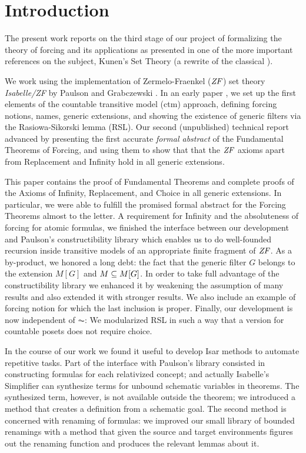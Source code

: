 \section{Introduction}
\label{sec:introduction}

The present work reports on the third stage of our project of
formalizing the theory of forcing and its applications as presented in
one of the more
important references on the subject, Kunen's Set Theory
\cite{kunen2011set} (a rewrite of the classical \cite{kunen1980}). 

We
work using the  implementation of Zermelo-Fraenkel ($\mathit{ZF}$)
set theory \emph{Isabelle/ZF} by Paulson and Grabczewski \cite{DBLP:journals/jar/PaulsonG96}. In
an early paper \cite{2018arXiv180705174G}, we set up the first
elements of the countable transitive model (ctm) approach, defining
forcing notions, names, generic extensions, and
showing the existence of generic filters via the Rasiowa-Sikorski
lemma (RSL). Our second (unpublished) technical report
\cite{2019arXiv190103313G} advanced by presenting the first accurate
\emph{formal abstract} of the Fundamental Theorems of Forcing, and
using them to show that that the $\mathit{ZF}$ axioms apart from Replacement
and Infinity hold in all generic extensions.

This paper contains the proof of Fundamental Theorems and complete
proofs of the Axioms of Infinity, Replacement, and Choice in all
generic extensions. In particular, we were able to fulfill the
promised formal abstract for the Forcing 
Theorems almost to the letter. A requirement for Infinity and the
absoluteness of forcing for atomic formulas, we finished the interface
between our development and
Paulson's constructibility library \cite{paulson_2003} which enables
us to do well-founded
recursion inside transitive models of an appropriate finite fragment
of $\mathit{ZF}$. As a by-product, we honored a long debt: the fact that the
generic filter $G$ belongs to the extension $M[G]$ and 
$M\subseteq M[G]$. In order to take full advantage of the constructibility library
we enhanced it by weakening the assumption of many results and also
extended it with stronger results. %
We also include an example of forcing notion for which
the last inclusion is proper. 
Finally, our development is now independent of $\AC$: We modularized
RSL in such a way that a version for countable 
posets does not require choice.

In the course of our work we found it useful to develop Isar methods to
automate repetitive tasks. Part of the interface with Paulson's
library consisted in constructing formulas for each relativized
concept; and actually Isabelle's Simplifier can
synthesize terms for unbound schematic variables in theorems. The
synthesized term, however, is not available outside the theorem; we
introduced a method that creates a definition from a schematic
goal. The second method is concerned with renaming of formulas: we
improved our small library of bounded renamings with a method that
given the source and target environments figures out the renaming
function and produces the relevant lemmas about it.

